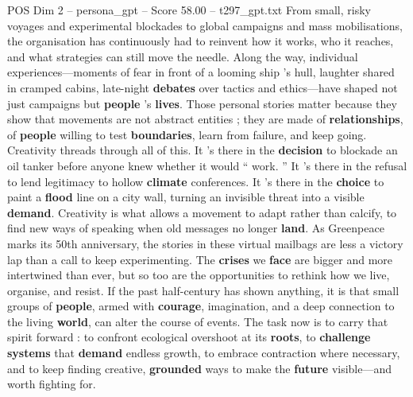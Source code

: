 \begin{textsample}{POS Dim 2 – persona\_gpt – Score 58.00 – t297\_gpt.txt}
From small, risky voyages and experimental blockades to global campaigns and mass mobilisations, the organisation has continuously had to reinvent how it works, who it reaches, and what strategies can still move the needle.
Along the way, individual experiences—moments of fear in front of a looming ship ’s hull, laughter shared in cramped cabins, late-night \textbf{debates} over tactics and ethics—have shaped not just campaigns but \textbf{people} ’s \textbf{lives}.
Those personal stories matter because they show that movements are not abstract entities ; they are made of \textbf{relationships}, of \textbf{people} willing to test \textbf{boundaries}, learn from failure, and keep going.
Creativity threads through all of this.
It ’s there in the \textbf{decision} to blockade an oil tanker before anyone knew whether it would “ work. ” It ’s there in the refusal to lend legitimacy to hollow \textbf{climate} conferences.
It ’s there in the \textbf{choice} to paint a \textbf{flood} line on a city wall, turning an invisible threat into a visible \textbf{demand}.
Creativity is what allows a movement to adapt rather than calcify, to find new ways of speaking when old messages no longer \textbf{land}.
As Greenpeace marks its 50th anniversary, the stories in these virtual mailbags are less a victory lap than a call to keep experimenting.
The \textbf{crises} we \textbf{face} are bigger and more intertwined than ever, but so too are the opportunities to rethink how we live, organise, and resist.
If the past half-century has shown anything, it is that small groups of \textbf{people}, armed with \textbf{courage}, imagination, and a deep connection to the living \textbf{world}, can alter the course of events.
The task now is to carry that spirit forward : to confront ecological overshoot at its \textbf{roots}, to \textbf{challenge} \textbf{systems} that \textbf{demand} endless growth, to embrace contraction where necessary, and to keep finding creative, \textbf{grounded} ways to make the \textbf{future} visible—and worth fighting for.

\end{textsample}
